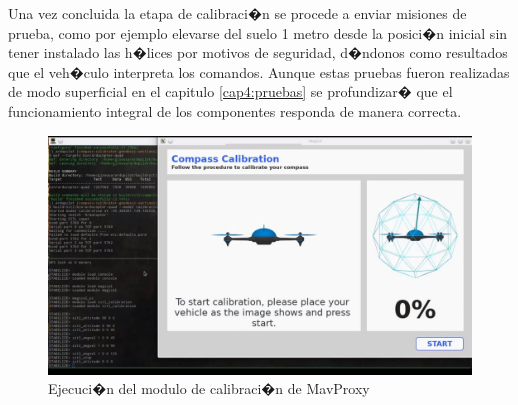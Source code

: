 Una vez concluida la etapa de calibraci�n se procede a enviar misiones de prueba, como por ejemplo elevarse del suelo 1 metro desde la posici�n inicial sin tener instalado las h�lices por motivos de seguridad, d�ndonos como resultados que el veh�culo interpreta los comandos. Aunque estas pruebas fueron realizadas de modo superficial en el capitulo \ref{cap4:pruebas} se profundizar� que el funcionamiento integral de los componentes responda de manera correcta.


\begin{figure}[h!]
\centering
\includegraphics[width=0.8\linewidth, height=0.4\textheight]{Imagenes/calibMavproxy}
\caption{Ejecuci�n del modulo de calibraci�n de MavProxy}
\label{fig:calibmavproxy}
\end{figure}


